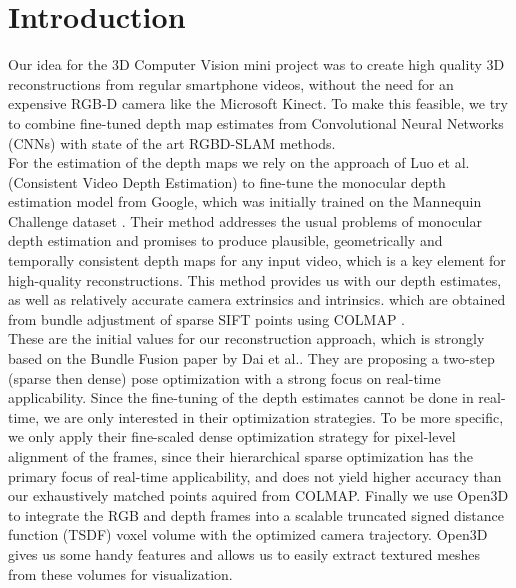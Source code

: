 \chapter{Introduction}
    Our idea for the 3D Computer Vision mini project was to create high quality 3D reconstructions from regular smartphone videos, without the need for an expensive RGB-D camera like the Microsoft Kinect.
    To make this feasible, we try to combine fine-tuned depth map estimates from Convolutional Neural Networks (CNNs) with state of the art RGBD-SLAM methods.\\
    For the estimation of the depth maps we rely on the approach of Luo et al. \cite{luo2020consistent} (Consistent Video Depth Estimation) to fine-tune the monocular depth estimation model from Google, which was initially trained on the Mannequin Challenge dataset \cite{mannequin}.
    Their method addresses the usual problems of monocular depth estimation and promises to produce plausible, geometrically and temporally consistent depth maps for any input video, which is a key element for high-quality reconstructions.
    This method provides us with our depth estimates, as well as relatively accurate camera extrinsics and intrinsics. which are obtained from bundle adjustment of sparse SIFT points using COLMAP \cite{colmap}.\\
    These are the initial values for our reconstruction approach, which is strongly based on the Bundle Fusion paper \cite{dai2017bundlefusion} by Dai et al..
    They are proposing a two-step (sparse then dense) pose optimization with a strong focus on real-time applicability.
    Since the fine-tuning of the depth estimates cannot be done in real-time, we are only interested in their optimization strategies.
    To be more specific, we only apply their fine-scaled dense optimization strategy for pixel-level alignment of the frames, since their hierarchical sparse optimization has the primary focus of real-time applicability, and does not yield higher accuracy than our exhaustively matched points aquired from COLMAP.
    Finally we use Open3D \cite{open3d} to integrate the RGB and depth frames into a scalable truncated signed distance function (TSDF) voxel volume with the optimized camera trajectory. Open3D gives us some handy features and allows us to easily extract textured meshes from these volumes for visualization.\\
